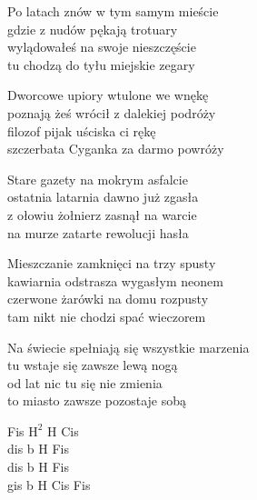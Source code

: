 \begin{textn}
    Po latach znów w tym samym mieście\\
    gdzie z nudów pękają trotuary\\
    wylądowałeś na swoje nieszczęście\\
    tu chodzą do tyłu miejskie zegary

    Dworcowe upiory wtulone we wnękę\\
    poznają żeś wrócił z dalekiej podróży\\
    filozof pijak uściska ci rękę\\
    szczerbata Cyganka za darmo powróży

    Stare gazety na mokrym asfalcie\\
    ostatnia latarnia dawno już zgasła\\
    z ołowiu żołnierz zasnął na warcie\\
    na murze zatarte rewolucji hasła

    Mieszczanie zamknięci na trzy spusty\\
    kawiarnia odstrasza wygasłym neonem\\
    czerwone żarówki na domu rozpusty\\
    tam nikt nie chodzi spać wieczorem

    Na świecie spełniają się wszystkie marzenia\\
    tu wstaje się zawsze lewą nogą\\
    od lat nic tu się nie zmienia\\
    to miasto zawsze pozostaje sobą
\end{textn}
\begin{chordw}
    Fis $\mathrm{H^{2}}$ H Cis\\
    dis b H Fis\\
    dis b H Fis\\
    gis b H Cis Fis
\end{chordw}
